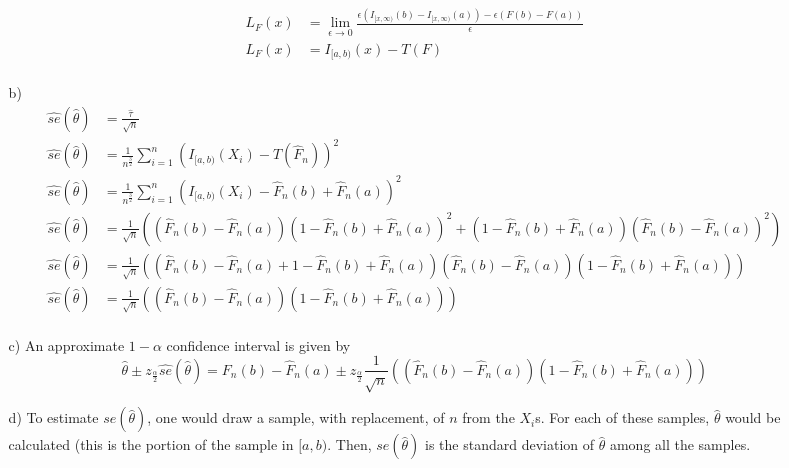 \documentclass[11pt]{article}
\theoremstyle{definition}
\begin{document}
\begin{itemize}
\begin{itemize}
\begin{align*}
                    L_F(x)&=\lim_{\epsilon\to 0} \frac{\epsilon(I_{[x,\infty)}(b)-I_{[x,\infty)}(a))-\epsilon (F(b)-F(a))}{\epsilon} \\
                    L_F(x)&= I_{[a,b)}(x)-T(F) \\
                \end{align*}
            \item[b)]
                \begin{align*}
                    \hat{se}(\hat \theta) &= \frac{\hat \tau}{\sqrt{n}} \\
                    \hat{se}(\hat \theta) &= \frac{1}{n^\frac{3}{2}}\sum_{i=1}^n(I_{[a,b)}(X_i)-T(\hat F_n))^2 \\
                    \hat{se}(\hat \theta) &= \frac{1}{n^\frac{3}{2}}\sum_{i=1}^n(I_{[a,b)}(X_i)-\hat F_n(b)+\hat F_n(a))^2 \\
                    \hat{se}(\hat \theta) &= \frac{1}{\sqrt{n}}\left((\hat F_n(b)-\hat F_n(a))(1-\hat F_n(b)+\hat F_n(a))^2+(1-\hat F_n(b)+\hat F_n(a))(\hat F_n(b)-\hat F_n(a))^2\right) \\
                    \hat{se}(\hat \theta) &= \frac{1}{\sqrt{n}}\left((\hat F_n(b)-\hat F_n(a)+1- \hat F_n(b)+\hat F_n(a))(\hat F_n(b)-\hat F_n(a))(1-\hat F_n(b)+\hat F_n(a))\right) \\
                    \hat{se}(\hat \theta) &= \frac{1}{\sqrt{n}}\left((\hat F_n(b)-\hat F_n(a))(1-\hat F_n(b)+\hat F_n(a))\right) \\
                \end{align*}
            \item[c)]
                An approximate \(1-\alpha\) confidence interval is given by 
                \[\hat \theta \pm z_{\frac{\alpha}{2}}\hat{se}(\hat \theta) = F_n(b)-\hat F_n(a) \pm z_{\frac{\alpha}{2}}\frac{1}{\sqrt{n}}\left((\hat F_n(b)-\hat F_n(a))(1-\hat F_n(b)+\hat F_n(a))\right)\]
            \item[d)]
                To estimate \(se(\hat \theta)\), one would draw a sample, with replacement, of $n$ from the $X_i$s. For each of these samples, $\hat\theta$ would be calculated (this is the portion of the sample in \([a,b)\). Then, \(se(\hat \theta)\) is the standard deviation of $\hat\theta$ among all the samples.


\end{itemize}
\end{itemize}
\end{document}
